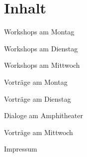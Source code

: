 \section*{Inhalt}

\vspace*{0.35em}%
\noindent Workshops am Montag \dotfill \pageref{montag-workshops}

\vspace*{0.35em}%
\noindent Workshops am Dienstag \dotfill \pageref{dienstag-workshops}

\vspace*{0.35em}%
\noindent Workshops am Mittwoch \dotfill \pageref{mittwoch-workshops}

\vspace*{0.35em}%
\noindent Vorträge am Montag \dotfill \pageref{montag}

\vspace*{0.35em}%
\noindent Vorträge am Dienstag \dotfill \pageref{dienstag}

\vspace*{0.35em}%
\noindent Dialoge am Amphitheater \dotfill \pageref{social-event}

\vspace*{0.35em}%
\noindent Vorträge am Mittwoch \dotfill \pageref{mittwoch}

\vspace*{0.35em}%
\noindent Impressum \dotfill \pageref{impressum}
